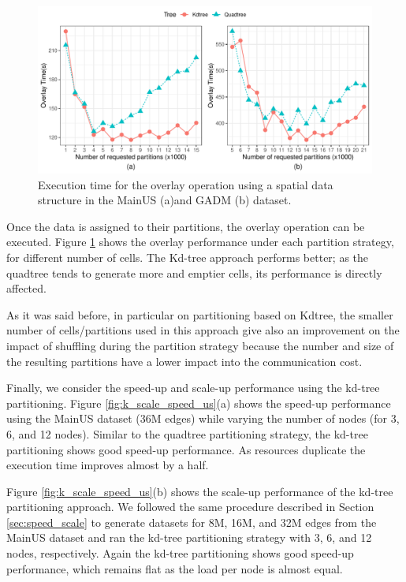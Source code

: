 \begin{figure}
    \centering
    \includegraphics[width=\textwidth]{chapterExtension/K/K_Overlay} 
    \caption{Execution time for the overlay operation using a spatial data structure in the MainUS (a)and GADM (b) dataset.} \label{fig:k_overlay_us}
\end{figure}

Once the data is assigned to their partitions, the overlay operation can be executed.  Figure \ref{fig:k_overlay_us} shows the overlay performance under each partition strategy, for different number of cells. The Kd-tree approach performs better; as the quadtree tends to generate more and emptier cells, its performance is directly affected.

As it was said before, in particular on partitioning based on Kdtree, the smaller number of cells/partitions used in this approach give also an improvement on the impact of shuffling during the partition strategy because the number and size of the resulting partitions have a lower impact into the communication cost.

Finally, we consider the speed-up and scale-up performance using the kd-tree partitioning. Figure \ref{fig:k_scale_speed_us}(a) shows the speed-up performance using the MainUS dataset (36M edges) while varying the number of nodes (for 3, 6, and 12 nodes). Similar to the quadtree partitioning strategy, the kd-tree partitioning shows good speed-up performance. As resources duplicate the execution time improves almost by a half.

Figure \ref{fig:k_scale_speed_us}(b) shows the scale-up performance of the kd-tree partitioning approach. We followed the same procedure described in Section \ref{sec:speed_scale} to generate datasets for 8M, 16M, and 32M edges from the MainUS dataset and ran the kd-tree partitioning strategy with 3, 6, and 12 nodes, respectively. Again the kd-tree partitioning shows good speed-up performance, which remains flat as the load per node is almost equal.

